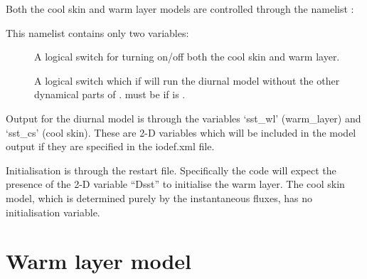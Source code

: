 \documentclass[../main/NEMO_manual]{subfiles}
\begin{document}
Both the cool skin and warm layer models are controlled through the namelist :

\begin{listing}
  \caption{}
  \label{lst:namdiu}
\end{listing}

This namelist contains only two variables:
\begin{description}
\item [{}] A logical switch for turning on/off both the cool skin and warm layer.
\item [{}] A logical switch which if  will run the diurnal model without the other dynamical parts of \NEMO.
   must be  if  is .
\end{description}

Output for the diurnal model is through the variables `sst\_wl' (warm\_layer) and `sst\_cs' (cool skin).
These are 2-D variables which will be included in the model output if they are specified in the iodef.xml file.

Initialisation is through the restart file.
Specifically the code will expect the presence of the 2-D variable ``Dsst'' to initialise the warm layer.
The cool skin model, which is determined purely by the instantaneous fluxes, has no initialisation variable.

\section{Warm layer model}
\label{sec:DIU_warm_layer_sec}
\end{document}
